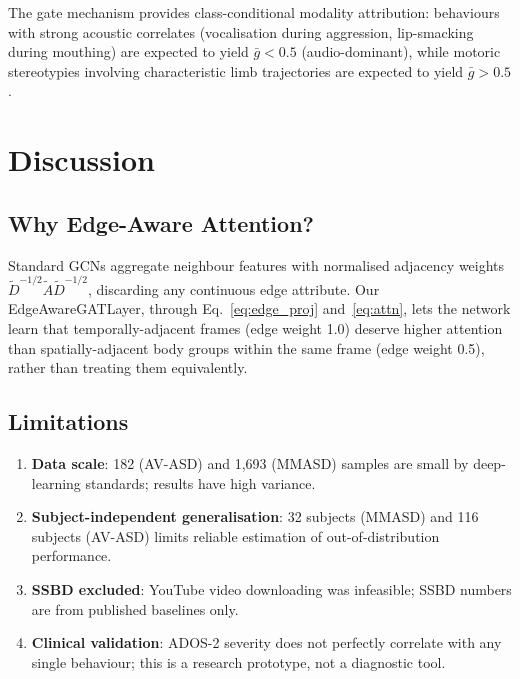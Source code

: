 \documentclass[conference]{IEEEtran}
\begin{document}
The gate mechanism provides class-conditional modality attribution: behaviours 
with strong acoustic correlates (vocalisation during aggression, lip-smacking during 
mouthing) are expected to yield $\bar{g} < 0.5$ (audio-dominant), while motoric 
stereotypies involving characteristic limb trajectories are expected to yield $\bar{g} > 0.5$.

\section{Discussion}

\subsection{Why Edge-Aware Attention?}

Standard GCNs aggregate neighbour features with normalised adjacency weights 
$\tilde{D}^{-1/2}\tilde{A}\tilde{D}^{-1/2}$, discarding any continuous edge attribute. 
Our EdgeAwareGATLayer, through Eq.~\eqref{eq:edge_proj} and~\eqref{eq:attn}, lets 
the network learn that temporally-adjacent frames (edge weight 1.0) deserve higher 
attention than spatially-adjacent body groups within the same frame (edge weight 0.5), 
rather than treating them equivalently.

\subsection{Limitations}

\begin{enumerate}
  \item \textbf{Data scale}: 182 (AV-ASD) and 1,693 (MMASD) samples are small by 
        deep-learning standards; results have high variance.
  \item \textbf{Subject-independent generalisation}: 32 subjects (MMASD) and 116 subjects 
        (AV-ASD) limits reliable estimation of out-of-distribution performance.
  \item \textbf{SSBD excluded}: YouTube video downloading was infeasible; SSBD 
        numbers are from published baselines only.
  \item \textbf{Clinical validation}: ADOS-2 severity does not perfectly correlate 
        with any single behaviour; this is a research prototype, not a diagnostic tool.
\end{enumerate}
\end{document}
